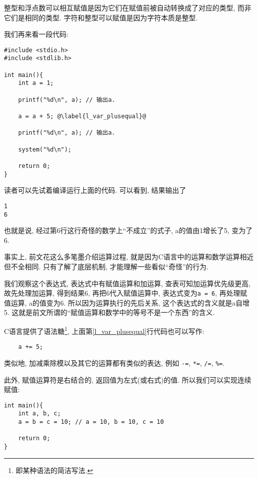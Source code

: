         整型和浮点数可以相互赋值是因为它们在赋值前被自动转换成了对应的类型, 而非它们是相同的类型. 字符和整型可以赋值是因为字符本质是整型.

        我们再来看一段代码:
\begin{lstlisting}
#include <stdio.h>
#include <stdlib.h>

int main(){
    int a = 1;

    printf("%d\n", a); // 输出a.

    a = a + 5; @\label{l_var_plusequal}@

    printf("%d\n", a); // 输出a.

    system("%d\n");

    return 0;
}
\end{lstlisting}

        读者可以先试着编译运行上面的代码. 可以看到, 结果输出了
\begin{lstlisting}
1
6
\end{lstlisting}

        也就是说, 经过第6行这行奇怪的数学上``不成立''的式子, a的值由1增长了5, 变为了6. 
        
        事实上, 前文花这么多笔墨介绍运算过程, 就是因为C语言中的运算和数学运算相近但不全相同. 只有了解了底层机制, 才能理解一些看似``奇怪''的行为.

        我们观察这个表达式, 表达式中有赋值运算和加运算, 查表可知加运算优先级更高, 故先处理加运算, 得到结果6, 再把6代入赋值运算中, 表达式变为\texttt{a = 6}, 再处理赋值运算, a的值变为6. 所以因为运算执行的先后关系, 这个表达式的含义就是a自增5. 这就是前文所谓的``赋值运算和数学中的等号不是一个东西''的含义.

        C语言提供了语法糖\footnote{即某种语法的简洁写法.}, 上面第\ref{l_var_plusequal}行代码也可以写作:
\begin{lstlisting}
    a += 5;
\end{lstlisting}

        类似地, 加减乘除模以及其它的运算都有类似的表达, 例如 \texttt{-=}, \texttt{*=}, \texttt{/=}, \texttt{\%=}.

        此外, 赋值运算符是右结合的, 返回值为左式(或右式)的值. 所以我们可以实现连续赋值:
\begin{lstlisting}
int main(){
    int a, b, c;
    a = b = c = 10; // a = 10, b = 10, c = 10

    return 0;
}
\end{lstlisting}

